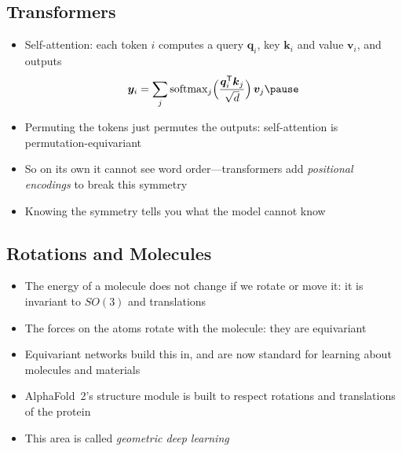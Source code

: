 \begin{slide}
\section[-1]{Transformers}

\begin{PauseHighLight}
  \begin{itemize}
  \item Self-attention: each token $i$ computes a query $\bm{q}_i$, key
    $\bm{k}_i$ and value $\bm{v}_i$, and outputs
    \begin{align*}
      \bm{y}_i = \sum_j \mathrm{softmax}_j\Bigl(\frac{\bm{q}_i^\tr
      \bm{k}_j}{\sqrt{d}}\Bigr)\,\bm{v}_j\pause
    \end{align*}
  \item Permuting the tokens just permutes the outputs: self-attention
    is permutation-equivariant\pause
  \item So on its own it cannot see word order\pause{}---transformers add
    \emph{positional encodings} to break this symmetry\pauseb
  \item Knowing the symmetry tells you what the model cannot know\pause
  \end{itemize}
\end{PauseHighLight}

\end{slide}

\begin{slide}
\section[-1]{Rotations and Molecules}

\begin{PauseHighLight}
  \begin{itemize}
  \item The energy of a molecule does not change if we rotate or move
    it: it is invariant to $SO(3)$ and translations\pause
  \item The forces on the atoms rotate with the molecule: they are
    equivariant\pause
  \item Equivariant networks build this in, and are now standard for
    learning about molecules and materials\pause
  \item AlphaFold~2's structure module is built to respect rotations and
    translations of the protein\pause
  \item This area is called \emph{geometric deep learning}\pause
  \end{itemize}
\end{PauseHighLight}

\end{slide}

